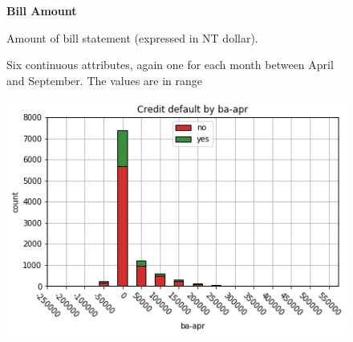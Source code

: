 \smallskip
\begin{figure}[h]
  \begin{minipage}[h]{.50\textwidth}
        {\Large \textbf{Bill Amount}}
        
        Amount of bill statement (expressed in NT dollar).
        
        Six continuous attributes, again one for each month between April and September.
        The values are in range
        
  \end{minipage}
  \begin{minipage}[h]{.50\textwidth}
    \includegraphics[width=.95\textwidth]{img/ch2/bill_amount_1}
  \end{minipage}
\end{figure}

